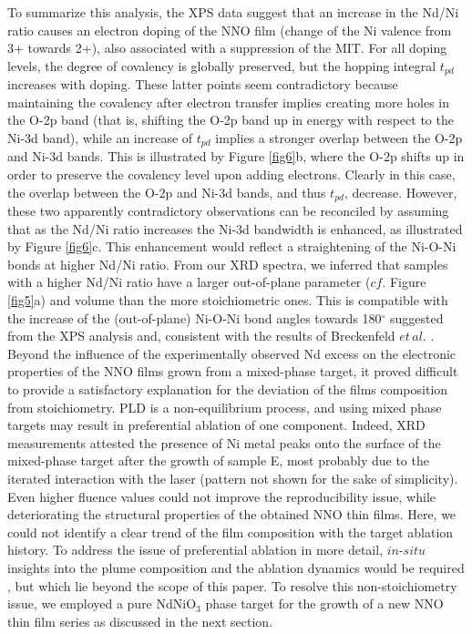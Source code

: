 \documentclass[aip,graphicx,numerical]{revtex4-1}
\begin{document}
To summarize this analysis, the XPS data suggest that an increase in the Nd/Ni ratio causes an electron doping of the NNO film (change of the Ni valence from 3+ towards 2+), also associated with a suppression of the MIT. For all doping levels, the degree of covalency is globally preserved, but the hopping integral $t_{pd}$ increases with doping. These latter points seem contradictory because maintaining the covalency after electron transfer implies creating more holes in the O-2p band (that is, shifting the O-2p band up in energy with respect to the Ni-3d band), while an increase of $t_{pd}$ implies a stronger overlap between the O-2p and Ni-3d bands. 
This is illustrated by Figure \ref{fig6}b, where the O-2p shifts up in order to preserve the covalency level upon adding electrons. Clearly in this case, the overlap between the O-2p and Ni-3d bands, and thus $t_{pd}$, decrease. However, these two apparently contradictory observations can be reconciled by assuming that as the Nd/Ni ratio increases the Ni-3d bandwidth is enhanced, as illustrated by Figure \ref{fig6}c. This enhancement would reflect a straightening of the Ni-O-Ni bonds at higher Nd/Ni ratio. From our XRD spectra, we inferred that samples with a higher Nd/Ni ratio have a larger out-of-plane parameter ($cf.$ Figure \ref{fig5}a) and volume than the more stoichiometric ones. This is compatible with the increase of the (out-of-plane) Ni-O-Ni bond angles towards 180$^{\circ}$ suggested from the XPS analysis and, consistent with the results of Breckenfeld $et\,al.$ \cite{Breckenfeld_2014} .\\
Beyond the influence of the experimentally observed Nd excess on the electronic properties of the NNO films grown from a mixed-phase target, it proved difficult to provide a satisfactory explanation for the deviation of the films composition from stoichiometry. PLD is a non-equilibrium process, and using mixed phase targets may result in preferential ablation of one component. Indeed, XRD measurements attested the presence of Ni metal peaks onto the surface of the mixed-phase target after the growth of sample E, most probably due to the iterated interaction with the laser (pattern not shown for the sake of simplicity). Even higher fluence values could not improve the reproducibility issue, while deteriorating the structural properties of the obtained NNO thin films. Here, we could not identify a clear trend of the film composition with the target ablation history. To address the issue of preferential ablation in more detail, $\textit{in-situ}$ insights into the plume composition and the ablation dynamics would be required \cite{Orsel2015} , but which lie beyond the scope of this paper.
To resolve this non-stoichiometry issue, we employed a pure NdNiO$_3$ phase target for the growth of a new NNO thin film series as discussed in the next section.
\end{document}
